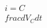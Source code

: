 \documentclass[preview]{standalone}
\begin{document}
\begin{align*}
i = C \\frac{dV_C}{dt}
\end{align*}
\end{document}
